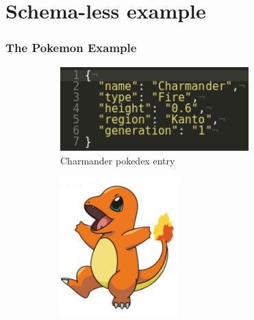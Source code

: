 \documentclass{beamer}
\begin{document}
\section{Schema-less example}
\begin{frame}
\frametitle{The Pokemon Example}
\begin{figure}
\centering  
\begin{subfigure}{.8\textwidth}
    \centering  
    \includegraphics[width=0.8\textwidth]{Pokemon1.png}
  \caption{Charmander pokedex entry}
\end{subfigure}%
\pause
\begin{subfigure}{.2\textwidth}
  \centering  
  \includegraphics[width=0.5\textwidth]{Charmander.png}
\end{subfigure}
\end{figure}
\end{frame}
\end{document}
